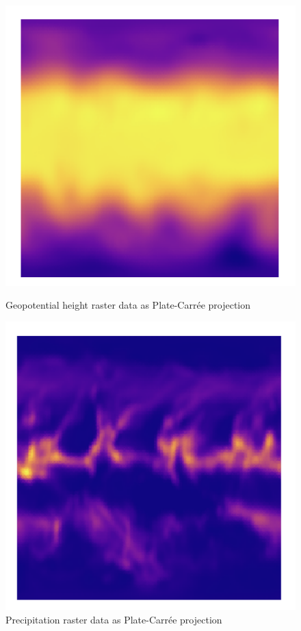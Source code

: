 \begin{figure}[h]
    \centering
    \begin{minipage}{0.45\textwidth}
        \centering
        \includegraphics[width=0.9\linewidth]{figures/chapter-5/plate_caree_geopoth_raster.png}
        \caption{ Geopotential height raster data as Plate-Carrée projection}
        \label{fig:plate_geopoth_raster}
    \end{minipage}\hfill
    \begin{minipage}{0.45\textwidth}
        \centering
        \includegraphics[width=0.9\linewidth]{figures/chapter-5/plate_caree_prect_raster.png}
        \caption{Precipitation raster data as Plate-Carrée projection}
        \label{fig:plate_prect_raster}
    \end{minipage}\hfill
\end{figure}

